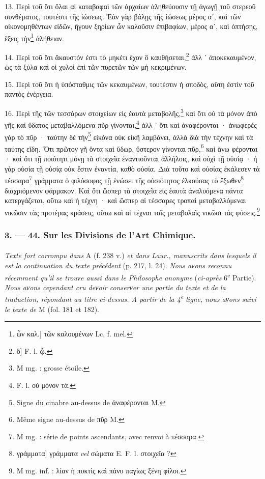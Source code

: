 \documentclass[a4paper, 11pt, oneside, polutonikogreek, french]{article}
\begin{document}
13. Περὶ τοῦ ὅτι ὅλαι αἱ καταβαφαὶ τῶν ἀρχαίων ἀληθεύουσιν τῇ ἀγωγῇ τοῦ στερεοῦ συνθέματος, τουτέστι τῆς ἰώσεως. Ἐὰν γὰρ βάλῃς τῆς ἰώσεως μέρος αʹ, καὶ τῶν οἰκονομηθέντων εἰδῶν, ἤγουν ξηρίων ὧν καλοῦσιν ἐπιβαφίων, μέρος αʹ, καὶ ὀπτήσῃς, ἕξεις τὴν\footnote{ὧν καλ.] τῶν καλουμένων Lc, f. mel.} ἀλήθειαν.

14. Περὶ τοῦ ὅτι ἄκαυστόν ἐστι τὸ μηκέτι ἔχον ὃ καυθήσεται,\footnote{ὃ] F. l. ᾧ.} ἀλλ ᾽ ἀποκεκαυμένον, ὡς τὰ ξύλα καὶ οἱ χυλοὶ ἐπὶ τῶν πυρετῶν τῶν μὴ κεκριμένων.

15. Περὶ τοῦ ὅτι ἡ ὑπόσταθμις τῶν κεκαυμένων, τουτέστιν ἡ σποδὸς, αὕτη ἐστὶν τοῦ παντὸς ἐνέργεια.

16. Περὶ τῆς τῶν τεσσάρων στοιχείων εἰς ἑαυτὰ μεταβολῆς,\footnote{M mg. : grosse étoile.} καὶ ὅτι οὐ τὰ μόνον ἀπὸ γῆς καὶ ὕδατος μεταβαλλόμενα πῦρ γίνονται,\footnote{F. l. οὐ μόνον τὰ.} ἀλλ ᾽ ὅτι καὶ ἀναφέρονται · ἀνωφερὲς γὰρ τὸ πῦρ · ταύτην δὲ τὴν\footnote{Signe du cinabre au-dessus de ἀναφέρονται M.} εἰκόνα οὐκ εἰκῆ λαμβάνει, ἀλλὰ διὰ τὴν τέχνην καὶ τὰ ταύτης εἴδη. Ὅτι πρῶτον γῆ ὄντα καὶ ὕδωρ, ὕστερον γίνονται πῦρ,\footnote{Même signe au-dessus de πῦρ M.} καὶ ἄνω φέρονται · καὶ ὅτι τῇ ποιότητι μόνῃ τὰ στοιχεῖα ἐναντιοῦνται ἀλλήλοις, καὶ οὐχὶ τῇ οὐσίᾳ · ἡ γὰρ οὐσία τῇ οὐσίᾳ οὐκ ἔστιν ἐναντία, καθὸ οὐσία. Διὰ τοῦτο καὶ οὐσίας ἐκάλεσεν τὰ τέσσαρα\footnote{M mg. : série de points ascendants, avec renvoi à τέσσαρα.} γράμματα ὁ φιλόσοφος τῇ ἑνώσει τῆς οὐσιότητος ἑλκούσας τὸ ἔξωθεν\footnote{γράμματα] γράμματα \emph{vel} σώματα E. F. l. στοιχεῖα ?} διαχριόμενον φάρμακον. Καὶ ὅτι ὥσπερ τὰ στοιχεῖα εἰς ἑαυτὰ ἀναλυόμενα πάντα κατεργάζεται, οὕτω καὶ ἡ τέχνη · καὶ ὥσπερ αἱ τέσσαρες τροπαὶ μεταβαλλόμεναι νικῶσιν τὰς προτέρας κράσεις, οὕτω καὶ αἱ τέχναι ταῖς μεταβολαῖς νικῶσι τὰς φύσεις.\footnote{M mg. inf. : λίαν ἡ πυκτὶς καὶ πάνυ παγίως ξένη φίλοι.}

\bigskip
\centerline{\EightStarTaper}
\centerline{\EightStarTaper\EightStarTaper}
\bigskip

\subsubsection{3. --- 44. Sur les Divisions de l'Art Chimique.}
\paragraph{}
\emph{Texte fort corrompu dans} A (f. 238 v.) \emph{et dans Laur., manuscrits dans lesquels il est la continuation du texte précédent} (p. 217, l. 24). \emph{Nous aνons reconnu récemment qu'il se trouνe aussi dans le Philosophe anonyme} (\emph{ci-après} 6\textsuperscript{e} Partie). \emph{Nous aνons cependant cru deνoir conserνer une partie du texte et de la traduction, répondant au titre ci-dessus. A partir de la 4\textsuperscript{e} ligne, nous aνons suivi le texte de} M (fol. 181 et 182).
\end{document}
